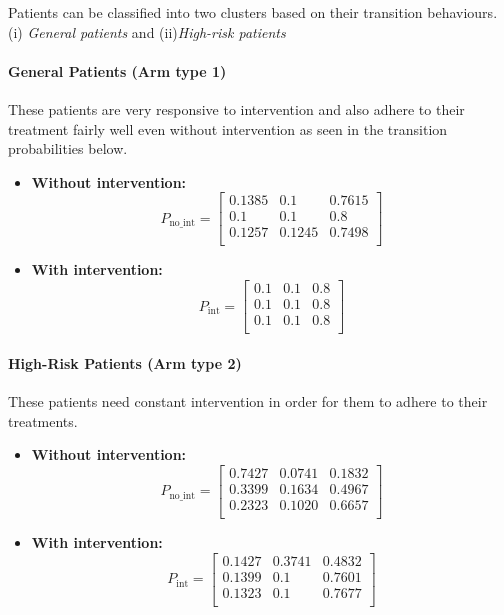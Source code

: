 \documentclass{article} %
\begin{document}
{ Patients can be classified into two clusters based on their transition behaviours.
 (i) \textit{General patients}  and  (ii)\textit{High-risk patients}

\paragraph{General Patients (Arm type 1)}
These patients are very responsive to intervention and also adhere to their treatment fairly well even without intervention as seen in the transition probabilities below.
\begin{itemize}
    \item \textbf{Without intervention:}
    \[
    P_{\text{no\_int}} = \begin{bmatrix}
    0.1385 & 0.1 & 0.7615 \\
    0.1 & 0.1 & 0.8 \\
    0.1257 & 0.1245 & 0.7498 \\
    \end{bmatrix}
    \]
    \item \textbf{With intervention:}
    \[
    P_{\text{int}} = \begin{bmatrix}
    0.1 & 0.1 & 0.8 \\
    0.1 & 0.1 & 0.8 \\
    0.1 & 0.1 & 0.8 \\
    \end{bmatrix}
    \]
\end{itemize}



\paragraph{High-Risk Patients (Arm type 2)}
These patients need constant intervention in order for them to adhere to their treatments.
\begin{itemize}
    \item \textbf{Without intervention:}
    \[
    P_{\text{no\_int}} = \begin{bmatrix}
    0.7427 & 0.0741 & 0.1832 \\
    0.3399 & 0.1634 & 0.4967 \\
    0.2323 & 0.1020 & 0.6657 \\
    \end{bmatrix}
    \]
    \item \textbf{With intervention:}
    \[
    P_{\text{int}} = \begin{bmatrix}
    0.1427 & 0.3741 & 0.4832 \\
    0.1399 & 0.1 & 0.7601 \\
    0.1323 & 0.1 & 0.7677 \\
    \end{bmatrix}
    \]
\end{itemize}

}
\end{document}
